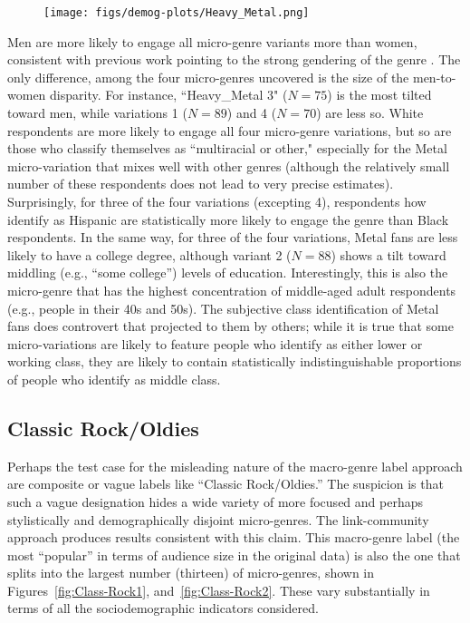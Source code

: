   \begin{figure}[ht!]
     \centering
     \texttt{[image: figs/demog-plots/Heavy\_Metal.png]}
     \caption{}
  \label{fig:metal}
 \end{figure}
 
Men are more likely to engage all micro-genre variants more than women, consistent with previous work pointing to the strong gendering of the genre \citep{miller2016gender}. The only difference, among the four micro-genres uncovered is the size of the men-to-women disparity. For instance, ``Heavy\_Metal 3" ($N = 75$) is the most tilted toward men, while variations 1 ($N=89$) and 4 ($N=70$) are less so. White respondents are more likely to engage all four micro-genre variations, but so are those who classify themselves as ``multiracial or other," especially for the Metal micro-variation that mixes well with other genres (although the relatively small number of these respondents does not lead to very precise estimates). Surprisingly, for three of the four variations (excepting 4), respondents how identify as Hispanic are statistically more likely to engage the genre than Black respondents. In the same way, for three of the four variations, Metal fans are less likely to have a college degree, although variant 2 ($N = 88$) shows a tilt toward middling (e.g., ``some college'') levels of education. Interestingly, this is also the micro-genre that has the highest concentration of middle-aged adult respondents (e.g., people in their 40s and 50s). The subjective class identification of Metal fans does controvert that projected to them by others; while it is true that some micro-variations are likely to feature people who identify as either lower or working class, they are likely to contain statistically indistinguishable proportions of people who identify as middle class. 
 
\subsection{Classic Rock/Oldies}
Perhaps the test case for the misleading nature of the macro-genre label approach are composite or vague labels like ``Classic Rock/Oldies.'' The suspicion is that such a vague designation hides a wide variety of more focused and perhaps stylistically and demographically disjoint micro-genres. The link-community approach produces results consistent with this claim. This macro-genre label (the most ``popular'' in terms of audience size in the original data) is also the one that splits into the largest number (thirteen) of micro-genres, shown in Figures~\ref{fig:Class-Rock1}, and~\ref{fig:Class-Rock2}. These vary substantially in terms of all the sociodemographic indicators considered. 

